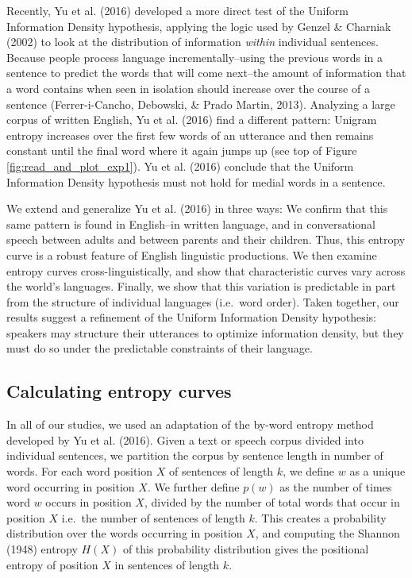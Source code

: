 \documentclass[10pt, letterpaper]{article}
\begin{document}
Recently, Yu et al. (2016) developed a more direct test of the Uniform
Information Density hypothesis, applying the logic used by Genzel \&
Charniak (2002) to look at the distribution of information \emph{within}
individual sentences. Because people process language
incrementally--using the previous words in a sentence to predict the
words that will come next--the amount of information that a word
contains when seen in isolation should increase over the course of a
sentence (Ferrer-i-Cancho, Debowski, \& Prado Martin, 2013). Analyzing a
large corpus of written English, Yu et al. (2016) find a different
pattern: Unigram entropy increases over the first few words of an
utterance and then remains constant until the final word where it again
jumps up (see top of Figure \ref{fig:read_and_plot_exp1}). Yu et al.
(2016) conclude that the Uniform Information Density hypothesis must not
hold for medial words in a sentence.

We extend and generalize Yu et al. (2016) in three ways: We confirm that
this same pattern is found in English--in written language, and in
conversational speech between adults and between parents and their
children. Thus, this entropy curve is a robust feature of English
linguistic productions. We then examine entropy curves
cross-linguistically, and show that characteristic curves vary across
the world's languages. Finally, we show that this variation is
predictable in part from the structure of individual languages
(i.e.~word order). Taken together, our results suggest a refinement of
the Uniform Information Density hypothesis: speakers may structure their
utterances to optimize information density, but they must do so under
the predictable constraints of their language.

\subsection{Calculating entropy
curves}\label{calculating-entropy-curves}

In all of our studies, we used an adaptation of the by-word entropy
method developed by Yu et al. (2016). Given a text or speech corpus
divided into individual sentences, we partition the corpus by sentence
length in number of words. For each word position \(X\) of sentences of
length \(k\), we define \(w\) as a unique word occurring in position
\(X\). We further define \(p(w)\) as the number of times word \(w\)
occurs in position \(X\), divided by the number of total words that
occur in position \(X\) i.e.~the number of sentences of length \(k\).
This creates a probability distribution over the words occurring in
position \(X\), and computing the Shannon (1948) entropy \(H(X)\) of
this probability distribution gives the positional entropy of position
\(X\) in sentences of length \(k\).
\end{document}
